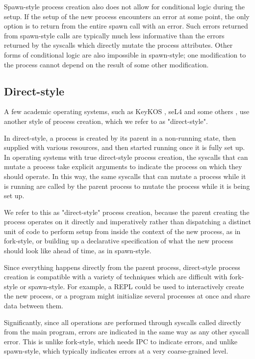 \documentclass[sigplan]{acmart}
\begin{document}
Spawn-style process creation also does not allow for conditional logic during the setup.
If the setup of the new process encounters an error at some point,
the only option is to return from the entire spawn call with an error.
Such errors returned from spawn-style calls
are typically much less informative
than the errors returned by the syscalls which directly mutate the process attributes.
Other forms of conditional logic are also impossible in spawn-style;
one modification to the process cannot depend on the result of some other modification.
\subsection{Direct-style}
A few academic operating systems, such as KeyKOS \cite{keykos}, seL4 \cite{sel4}
and some others \cite{exokernel} \cite{fuschia} \cite{singularity},
use another style of process creation, which we refer to as "direct-style".

In direct-style, a process is created by its parent in a non-running state,
then supplied with various resources,
and then started running once it is fully set up.
In operating systems with true direct-style process creation,
the syscalls that can mutate a process
take explicit arguments to indicate the process on which they should operate.
In this way, the same syscalls that can mutate a process while it is running
are called by the parent process to mutate the process while it is being set up.

We refer to this as "direct-style" process creation,
because the parent creating the process operates on it directly and imperatively
rather than dispatching a distinct unit of code to perform setup from inside the context of the new process,
as in fork-style,
or building up a declarative specification of what the new process should look like ahead of time,
as in spawn-style.

Since everything happens directly from the parent process,
direct-style process creation is compatible with a variety of techniques
which are difficult with fork-style or spawn-style.
For example, a REPL could be used to interactively create the new process,
or a program might initialize several processes at once and share data between them.

Significantly,
since all operations are performed through syscalls called directly from the main program,
errors are indicated in the same way as any other syscall error.
This is unlike fork-style, which needs IPC to indicate errors,
and unlike spawn-style, which typically indicates errors at a very coarse-grained level.
\end{document}
